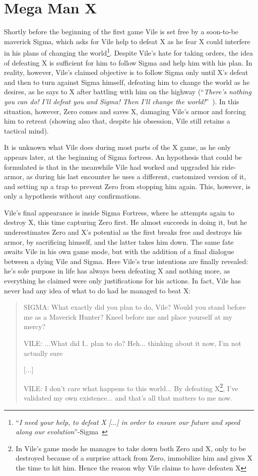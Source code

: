 \section{Mega Man X}
Shortly before the beginning of the first game Vile is set free by a soon-to-be maverick Sigma, which asks for Vile help to defeat X as he fear X could interfere in his plans of changing the world\footnote{``\textit{I need your help, to defeat X [$\dots$] in order to ensure our future and speed along our evolution}''-Sigma~\cite{MHX:Vile_script}}. Despite Vile's hate for taking orders, the idea of defeating X is sufficient for him to follow Sigma and help him with his plan. In reality, however, Vile's claimed objective is to follow Sigma only until X's defeat and then to turn against Sigma himself, defeating him to change the world as he desires, as he says to X after battling with him on the highway (``\textit{There's nothing you can do! I'll defeat you and Sigma! Then I'll change the world!}''~\cite{wiki:MM_MHX_script}). In this situation, however, Zero comes and saves X, damaging Vile's armor and forcing him to retreat (showing also that, despite his obsession, Vile still retains a tactical mind). 

It is unknown what Vile does during most parts of the X game, as he only appears later, at the beginning of Sigma fortress. An hypothesis that could be  formulated is that in the meanwhile Vile had worked and upgraded his ride-armor, as during his last encounter he uses a different, customized version of it, and setting up a trap to prevent Zero from stopping him again. This, however, is only a hypothesis without any confirmations.

Vile's final appearance is inside Sigma Fortress, where he attempts again to destroy X, this time capturing Zero first. He almost succeeds in doing it, but he underestimates Zero and X's potential as the first breaks free and destroys his armor, by sacrificing himself, and the latter takes him down. The same fate awaits Vile in his own game mode, but with the addition of a final dialogue between a dying Vile and Sigma. Here Vile's true intentions are finally revealed: he's sole purpose in life has always been defeating X and nothing more, as everything he claimed were only justifications for his actions. In fact, Vile has never had any idea of what to do had he managed to beat X:
\begin{quote}
	SIGMA: What exactly did you plan to do, Vile? Would you stand before me as a Maverick Hunter? Kneel before me and place yourself at my mercy?
	
	VILE: ...What did I.. plan to do? Heh... thinking about it now, I'm not actually sure
	
	[$\dots$]
	
	VILE: I don't care what happens to this world... By defeating X\footnote{In Vile's game mode he manages to take down both Zero and X, only to be destroyed because of a surprise attack from Zero, immobilize him and gives X the time to hit him. Hence the reason why Vile claims to have defeaten X}, I've validated
	my own existence... and that's all that matters to me now.
\end{quote}